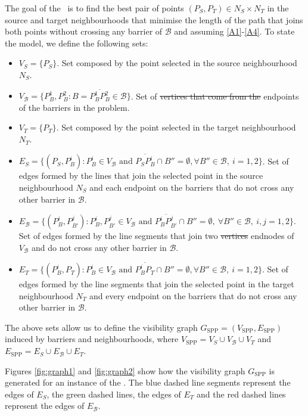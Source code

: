 \documentclass[a4paper,  review, authoryear, 1p.]{elsarticle}
\newcommand{\SPPN}{{\sf{H-SPPN}\xspace }}
\newcommand{\B}{{\mathcal B}}
\newcommand{\VB}{{V^{}_{\mathcal B}}}
\newcommand{\EB}{{E^{}_{\mathcal B}}}
\newcommand{\VS}{{V^{}_{S}}}
\newcommand{\ES}{{E^{}_{S}}}
\newcommand{\VT}{{V^{}_{T}}}
\newcommand{\ET}{{E^{}_{T}}}
\newcommand{\GSPP}{{G_{\text{SPP}}}}
\newcommand{\VSPP}{{V_{\text{SPP}}}}
\newcommand{\ESPP}{{E_{\text{SPP}}}}
\newcommand{\CV}[1]{{\color{red}#1}}
\begin{document}
	The goal of the \SPPN \ is to find the best pair of points $(P_{S}, P_{T})\in N_S\times N_T$ in the source and target neighbourhoods that minimise the length of the path that joins both points without crossing any barrier of $\mathcal B$ and assuming \ref{A1}-\ref{A4}. To state the model,  we define the following sets:
	\begin{itemize}
		\item $\VS=\{P_S\}$. Set composed by the point selected in the source neighbourhood $N_S$.
		\item $\VB=\{P^1_B, P^2_B:B=\overline{P^1_B P^2_B}\in \mathcal B\}$. Set of \sout{vertices that come from the} endpoints of the barriers in the problem.
		\item $\VT=\{P^{}_T\}$. Set composed by the point selected in the target neighbourhood $N_T$.
		\item $\ES=\{(P_S, P^i_{B}):P^i_B\in V_\B\text{ and } \overline{P_SP^i_B}\cap B''=\emptyset,\forall B''\in\B,\:i=1,2\}$. Set of edges formed by the lines that join the selected point in the source neighbourhood $N_S$ and each endpoint on the barriers that do not cross any other barrier in $\B$.
		\item $\EB=\{(P^{i}_B, P^{j}_{B'}):P^i_B, P^j_{B'}\in \VB \text{ and } \overline{P^i_B P^j_{B'}}\cap B''=\emptyset,\:\forall B''\in\mathcal B,\:i, j=1,2\}$. Set of edges formed by the line segments that join two \sout{vertices} \CV{endnodes} of $V_{\mathcal B}$ and do not cross any other barrier in $\B$.
		\item $\ET=\{(P^i_{B}, P^{}_T):P^i_B\in V_\B\text{ and } \overline{P^i_BP^{}_T}\cap B''=\emptyset,\forall B''\in\B,\:i=1,2\}$. Set of edges formed by the line segments that join the selected point in the target neighbourhood $N_T$ and every endpoint on the barriers that do not cross any other barrier in $\B$.
	\end{itemize} 
	
	The above sets allow us to define the \CV{visibility} graph $\GSPP= (\VSPP, \ESPP)$ induced by barriers and neighbourhoods, where $\VSPP=\VS\cup \VB\cup\VT$ and $\ESPP=\ES\cup\EB \cup\ET$. 
	
	Figures \ref{fig:graph1} and \ref{fig:graph2} show how the \CV{visibility} graph $\GSPP$ is generated for an instance of the \SPPN. The blue dashed line segments represent the edges of $\ES$, the green dashed lines, the edges of $\ET$ and the red dashed lines represent the edges of $\EB$. 
		
\end{document}
